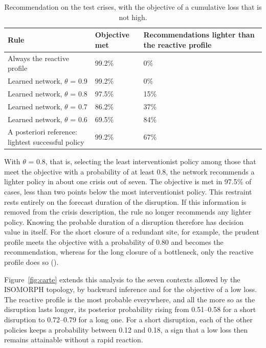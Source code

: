 \begin{table}[htbp]
\caption{Recommendation on the test crises, with the objective of a cumulative loss that is not high.}
\label{tab:d15}
\footnotesize
\begin{tabularx}{\textwidth}{@{}LLL@{}}
\toprule
\textbf{Rule} & \textbf{Objective met} & \textbf{Recommendations lighter than the reactive profile} \\
\midrule
Always the reactive profile & 99.2\% & 0\% \\
Learned network, $\theta$ = 0.9 & 99.2\% & 0\% \\
Learned network, $\theta$ = 0.8 & 97.5\% & 15\% \\
Learned network, $\theta$ = 0.7 & 86.2\% & 37\% \\
Learned network, $\theta$ = 0.6 & 69.5\% & 84\% \\
A posteriori reference: lightest successful policy & 99.2\% & 67\% \\
\bottomrule
\end{tabularx}
\end{table}

With $\theta$ = 0.8, that is, selecting the least interventionist policy among those that meet the objective with a probability of at least 0.8, the network recommends a lighter policy in about one crisis out of seven. The objective is met in 97.5\% of cases, less than two points below the most interventionist policy. This restraint rests entirely on the forecast duration of the disruption. If this information is removed from the crisis description, the rule no longer recommends any lighter policy. Knowing the probable duration of a disruption therefore has decision value in itself. For the short closure of a redundant site, for example, the prudent profile meets the objective with a probability of 0.80 and becomes the recommendation, whereas for the long closure of a bottleneck, only the reactive profile does so ().

Figure~\ref{fig:carte} extends this analysis to the seven contexts allowed by the ISOMORPH topology, by backward inference and for the objective of a low loss. The reactive profile is the most probable everywhere, and all the more so as the disruption lasts longer, its posterior probability rising from 0.51--0.58 for a short disruption to 0.72--0.79 for a long one. For a short disruption, each of the other policies keeps a probability between 0.12 and 0.18, a sign that a low loss then remains attainable without a rapid reaction.

